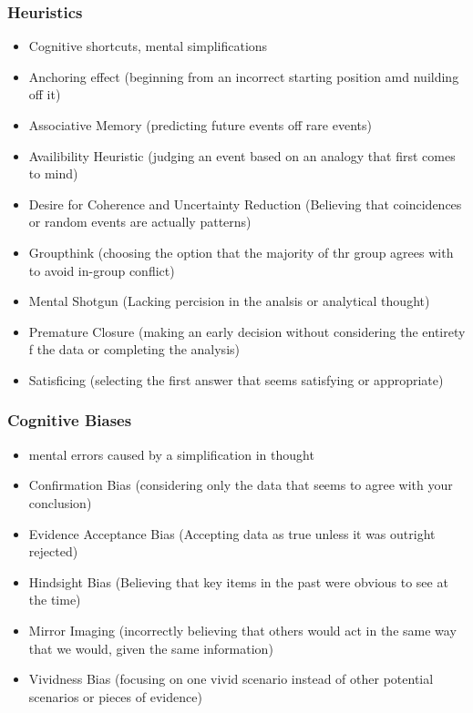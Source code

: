 \documentclass[11pt]{article}
\begin{document}
\subsubsection{Heuristics}
\label{sec:orgca52fec}
\begin{itemize}
\item Cognitive shortcuts, mental simplifications
\item Anchoring effect (beginning from an incorrect starting position amd nuilding off it)
\item Associative Memory (predicting future events off rare events)
\item Availibility Heuristic (judging an event based on an analogy that first comes to mind)
\item Desire for Coherence and Uncertainty Reduction (Believing that coincidences or random events are actually patterns)
\item Groupthink (choosing the option that the majority of thr group agrees with to avoid in-group conflict)
\item Mental Shotgun (Lacking percision in the analsis or analytical thought)
\item Premature Closure (making an early decision without considering the entirety f the data or completing the analysis)
\item Satisficing (selecting the first answer that seems satisfying or appropriate)
\end{itemize}
\subsubsection{Cognitive Biases}
\label{sec:orgb2bf17b}
\begin{itemize}
\item mental errors caused by a simplification in thought
\item Confirmation Bias (considering only the data that seems to agree with your conclusion)
\item Evidence Acceptance Bias (Accepting data as true unless it was outright rejected)
\item Hindsight Bias (Believing that key items in the past were obvious to see at the time)
\item Mirror Imaging (incorrectly believing that others would act in the same way that we would, given the same information)
\item Vividness Bias (focusing on one vivid scenario instead of other potential scenarios or pieces of evidence)
\end{itemize}
\end{document}
